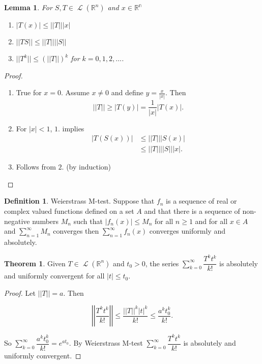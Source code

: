 \documentclass[12pt]{article}
\DeclareMathOperator{\LO}{\mathcal{L}}
\newtheorem*{lemma}{Lemma}
\theoremstyle{definition}
\newtheorem*{definition}{Definition}
\newtheorem{theorem}{Theorem}[section]  %
\begin{document}
\begin{lemma}
For $S, T \in \LO(\mathbb{R}^n)$ and $x \in \mathbb{R^n}$
\begin{enumerate}
\item $|T(x)| \leq ||T|| |x|$
\item $|| TS || \leq ||T|| ||S||$
\item $|| T^k || \leq (||T||)^k$ for $k = 0, 1, 2, \ldots$.
\end{enumerate}
\end{lemma}
\begin{proof}
\begin{enumerate}
\item True for $x = 0$. Assume $x \neq 0$ and define $y = \frac{x}{|x|}$. Then 
\[
||T|| \geq |T(y)| = \frac{1}{|x|} |T(x)|.
\]

\item For $|x| < 1$, $1.$ implies
\[
\begin{split}
|T(S(x))| &\leq ||T|| |S(x)| \\
&\leq ||T|| ||S|| |x|.
\end{split}
\]

\item Follows from $2.$ (by induction)
\end{enumerate}
\end{proof}


\begin{definition} Weierstrass M-test.
Suppose that $f_n$ is a sequence of real or complex valued functions defined on a set $A$ and that there is a sequence
of non-negative numbers $M_n$ such that $|f_n(x)| \leq M_n$ for all $n \geq 1$ and for all $x \in A$ and
$\displaystyle \sum^{\infty}_{n = 1} M_n$ converges then $\displaystyle \sum^{\infty}_{n=1} f_n(x)$ converges
uniformly and absolutely.

\end{definition}

\begin{theorem}
Given $T \in \LO(\mathbb{R}^n)$ and $t_0 > 0$, the series $\displaystyle \sum^{\infty}_{k=0} \dfrac{T^k t^k}{k!}$
is absolutely and uniformly convergent for all $|t| \leq t_0$.
\end{theorem}

\begin{proof}
Let $||T|| = a$. Then

\begin{equation*}
\left|\left| \dfrac{T^k t^k}{k!} \right|\right| \leq \dfrac{||T||^k |t|^k}{k!} \leq \dfrac{a^k t_{0}^{k}}{k!}.
\end{equation*}

So $\displaystyle \sum^{\infty}_{k=0} \dfrac{a^k t_{0}^{k}}{k!} = e^{at_0}$. By Weierstrass M-test 
$\displaystyle \sum^{\infty}_{k=0} \dfrac{T^k t^k}{k!}$ is absolutely and uniformly convergent.
\end{proof}
\end{document}
